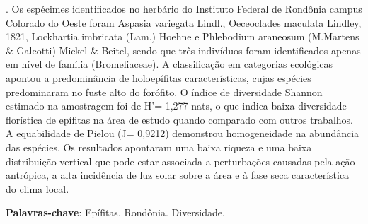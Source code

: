 \documentclass[article,12pt,onesidea,4paper,english,brazil]{abntex2}
\begin{document}
	. Os espécimes identificados no herbário do Instituto
	Federal de Rondônia campus Colorado do Oeste foram Aspasia variegata Lindl.,
	Oeceoclades maculata Lindley, 1821, Lockhartia imbricata (Lam.) Hoehne e
	Phlebodium araneosum (M.Martens \& Galeotti) Mickel \& Beitel, sendo que três
	indivíduos foram identificados apenas em nível de família (Bromeliaceae). A
	classificação em categorias ecológicas apontou a predominância de holoepífitas
	características, cujas espécies predominaram no fuste alto do forófito. O índice de
	diversidade Shannon estimado na amostragem foi de H’= 1,277 nats, o que indica
	baixa diversidade florística de epífitas na área de estudo quando comparado com
	outros trabalhos. A equabilidade de Pielou (J= 0,9212) demonstrou homogeneidade
	na abundância das espécies. Os resultados apontaram uma baixa riqueza e uma
	baixa distribuição vertical que pode estar associada a perturbações causadas pela
	ação antrópica, a alta incidência de luz solar sobre a área e à fase seca
	característica do clima local.
	
	\vspace{\onelineskip}
	
	\noindent
	\textbf{Palavras-chave}: Epífitas. Rondônia. Diversidade.
	
\end{document}
